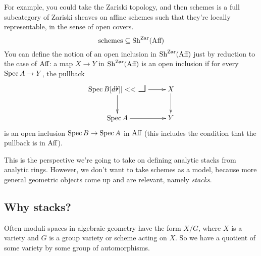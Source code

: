 For example, you could take the Zariski topology, and then schemes is a full subcategory of Zariski sheaves on affine schemes such that they're locally representable, in the sense of open covers.
\[
  \text{schemes} \subseteq \operatorname{Sh}^{\text{Zar}}(\text{Aff})
\]
You can define the notion of an open inclusion in $\operatorname{Sh}^{\text{Zar}}(\text{Aff})$ just by reduction to the case of $\text{Aff}$: a map $X\to Y$ in $\operatorname{Sh}^{\text{Zar}}(\text{Aff})$ is an open inclusion if for every $\operatorname{Spec} A\to Y$, the pullback
\[\xymatrix{
  \Spec B \ar[r] \ar[d] \pullback & X\ar[d]\\
  \Spec A \ar[r] & Y
}\]
is an open inclusion $\operatorname{Spec} B\to \operatorname{Spec} A$ in $\text{Aff}$ (this includes the condition that the pullback is in $\text{Aff}$).

This is the perspective we're going to take on defining analytic stacks from analytic rings. However, we don't want to take schemes as a model, because more general geometric objects come up and are relevant, namely \emph{stacks}.

\subsection{Why stacks?}
Often moduli spaces in algebraic geometry have the form $X/G$, where $X$ is a variety and $G$ is a group variety or scheme acting on $X$. So we have a quotient of some variety by some group of automorphisms.

